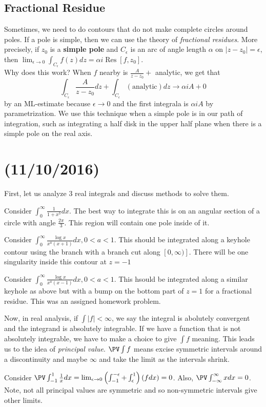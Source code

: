 \documentclass[11pt,leqno,oneside]{amsart}
\newcommand{\Res}{\operatorname{Res}}
\begin{document}
  \subsection*{Fractional Residue}
  Sometimes, we need to do contours that do not make complete circles
  around poles. If a pole is simple, then we can use the theory of
  \emph{fractional residues}. More precisely, if $z_0$ is a
  \textbf{simple pole} and $C_\epsilon$ is an arc of angle length
  $\alpha$ on $|z-z_0| = \epsilon$, then $\lim_{\epsilon \to 0}
  \int_{C_\epsilon} f(z)dz = \alpha i \Res[f,z_0]$. \\

  Why does this work? When $f$ nearby is $\frac{A}{z-z_0} + $
  analytic, we get that \[
    \int_{C_\epsilon} \frac{A}{z-z_0}dz + \int_{C_\epsilon}
    (\text{analytic})dz \to \alpha i A + 0
  \]
  by an ML-estimate because $\epsilon \to 0$ and the first integrala
  is $\alpha i A$ by parametrization. We use this technique when a
  simple pole is in our path of integration, such as integrating a
  half disk in the upper half plane when there is a simple pole on the
  real axis. 
\section{(11/10/2016)}
  First, let us analyze 3 real integrals and discuss methods to solve
  them.
  \begin{example}
    Consider $\int_0^\infty \frac{1}{1+x^3}dx$. The best way to
    integrate this is on an angular section of a circle with angle
    $\frac{2\pi}{3}$. This region will contain one pole inside of it.
  \end{example}
  \begin{example}
    Consider $\int_0^\infty \frac{\log x}{x^a(x+1)}dx, 0 < a < 1$. This should be
    integrated along a keyhole contour using the branch with a branch
    cut along $[0,\infty)]$.  There will be one singularity inside
    this contour at $z=-1$
  \end{example}
  \begin{example}
    Consider $\int_0^\infty \frac{\log x}{x^a(x-1)}dx, 0 < a <
    1$. This hsould be integrated along a similar keyhole as above but
    with a bump on the bottom part of $z=1$ for a fractional
    residue. This was an assigned homework problem.
  \end{example}
  Now, in real analysis, if $\int |f| < \infty$, we say the integral
  is abolutely convergent and the integrand is absolutely
  integrable. If we have a function that is not absolutely integrable,
  we have to make a choice to give $\int f$ meaning. This leads us to
  the idea of \emph{principal value}. $\PV \int f$ means excise
  symmetric intervals around a discontinuity and maybe $\infty$ and
  take the limit as the intervals shrink.
  \begin{example}
    Consider $\PV \int_{-1}^1 \frac{1}{x}dx = \lim_{\epsilon \to 0}
    \left( \int_{-1}^{-\epsilon} + \int_{\epsilon}^1 \right)(f dx) =
    0$. Also, $\PV \int_{-\infty}^\infty xdx = 0$. Note, not all
    principal values are symmetric and so non-symmetric intervals give
    other limits. 
  \end{example}
\end{document}
